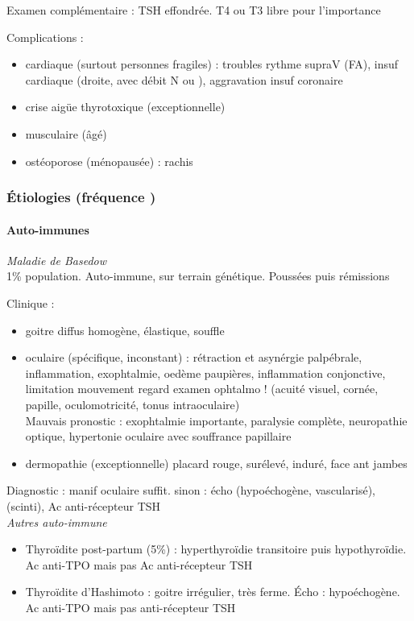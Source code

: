 \documentclass[11pt]{article}
\begin{document}
Examen complémentaire : TSH effondrée. T4 ou T3 libre pour l'importance

Complications : 
\begin{itemize}
\item cardiaque (surtout personnes fragiles) : troubles rythme supraV (FA), insuf
cardiaque (droite, avec débit N ou \inc), aggravation insuf coronaire
\item crise aigüe thyrotoxique (exceptionnelle)
\item musculaire (âgé)
\item ostéoporose (\female ménopausée) : rachis
\end{itemize}

\subsubsection{Étiologies (fréquence \dec)}
\label{sec:org5a346d8}
\paragraph{Auto-immunes}
\label{sec:orgc3cd9e4}
\emph{Maladie de Basedow}\\
1\% population. Auto-immune, sur terrain génétique. Poussées puis rémissions

Clinique : 
\begin{itemize}
\item goitre diffus homogène, élastique, souffle
\item oculaire (spécifique, inconstant) : rétraction et asynérgie palpébrale,
inflammation, exophtalmie, oedème paupières, inflammation conjonctive,
limitation mouvement regard
\thus examen ophtalmo ! (acuité visuel, cornée, papille, oculomotricité, tonus
intraoculaire)\\
Mauvais pronostic : exophtalmie importante, paralysie complète, neuropathie
optique, hypertonie oculaire avec souffrance papillaire
\item dermopathie (exceptionnelle) placard rouge, surélevé, induré, face ant jambes
\end{itemize}

Diagnostic : manif oculaire suffit. sinon : écho (hypoéchogène, vascularisé),
(scinti), Ac anti-récepteur TSH\\

\emph{Autres auto-immune}
\begin{itemize}
\item Thyroïdite post-partum (5\%) : hyperthyroïdie transitoire puis hypothyroïdie. Ac
anti-TPO mais pas Ac anti-récepteur TSH
\item Thyroïdite d'Hashimoto : goitre irrégulier, très ferme. Écho :
hypoéchogène. Ac anti-TPO mais pas anti-récepteur TSH
\end{itemize}
\end{document}
